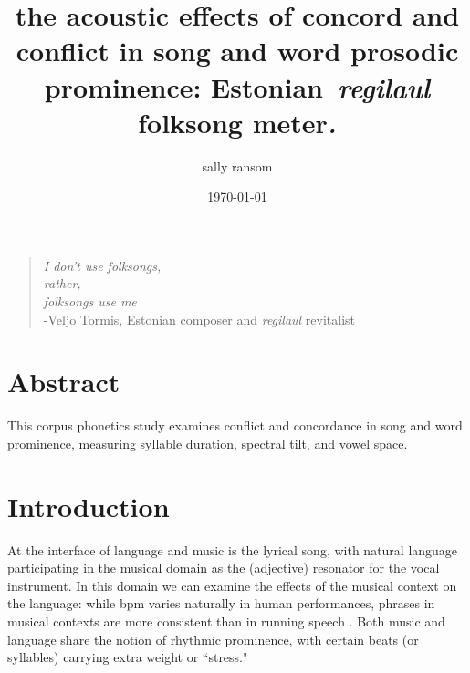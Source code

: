 \documentclass[11pt]{article}
\begin{document}
\title{the acoustic effects of concord and conflict in song and word prosodic
prominence: Estonian~\emph{regilaul} folksong meter\emph{.}}



\author[]{sally ransom}%
%


\vspace{-1em}



  \date{\today}


\begingroup
\let\center\flushleft
\let\endcenter\endflushleft
\maketitle
\endgroup


\bigskip
\begin{quote}\begin{center}
{\it I don't use folksongs, \\
rather,\\
folksongs use me}\\
-Veljo Tormis, Estonian composer and {\it regilaul} revitalist
\end{center}
\end{quote}


\titlepage





\sloppy







\section*{Abstract}

 This corpus phonetics study examines conflict and concordance in song and word prominence, measuring syllable duration, spectral tilt, and vowel space. 

 \section*{Introduction}
At the interface of language and music is the lyrical song, with natural language participating in the musical domain as the (adjective) resonator for the vocal instrument. In this domain we can examine the effects of the musical context on the language: while bpm varies naturally in human performances, phrases in musical contexts are more consistent than in running speech \cite{}. Both music and language share the notion of rhythmic prominence, with certain beats (or syllables) carrying extra weight or ``stress."  \\
\end{document}

